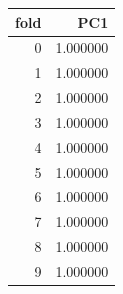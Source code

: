 \begin{tabular}{rr}
\toprule
fold & PC1 \\
\midrule
0 & 1.000000 \\
1 & 1.000000 \\
2 & 1.000000 \\
3 & 1.000000 \\
4 & 1.000000 \\
5 & 1.000000 \\
6 & 1.000000 \\
7 & 1.000000 \\
8 & 1.000000 \\
9 & 1.000000 \\
\bottomrule
\end{tabular}
